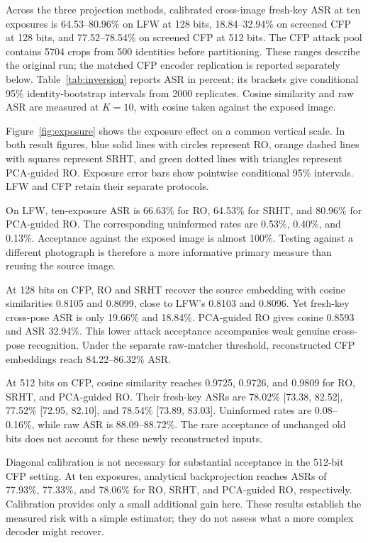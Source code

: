Across the three projection methods, calibrated cross-image fresh-key ASR at ten exposures is 64.53--80.96\% on LFW at 128 bits, 18.84--32.94\% on screened CFP at 128 bits, and 77.52--78.54\% on screened CFP at 512 bits. The CFP attack pool contains 5704 crops from 500 identities before partitioning. These ranges describe the original run; the matched CFP encoder replication is reported separately below. Table~\ref{tab:inversion} reports ASR in percent; its brackets give conditional 95\% identity-bootstrap intervals from 2000 replicates. Cosine similarity and raw ASR are measured at $K=10$, with cosine taken against the exposed image.

Figure~\ref{fig:exposure} shows the exposure effect on a common vertical scale. In both result figures, blue solid lines with circles represent RO, orange dashed lines with squares represent SRHT, and green dotted lines with triangles represent PCA-guided RO. Exposure error bars show pointwise conditional 95\% intervals. LFW and CFP retain their separate protocols.

On LFW, ten-exposure ASR is 66.63\% for RO, 64.53\% for SRHT, and 80.96\% for PCA-guided RO. The corresponding uninformed rates are 0.53\%, 0.40\%, and 0.13\%. Acceptance against the exposed image is almost 100\%. Testing against a different photograph is therefore a more informative primary measure than reusing the source image.

At 128 bits on CFP, RO and SRHT recover the source embedding with cosine similarities 0.8105 and 0.8099, close to LFW's 0.8103 and 0.8096. Yet fresh-key cross-pose ASR is only 19.66\% and 18.84\%. PCA-guided RO gives cosine 0.8593 and ASR 32.94\%. This lower attack acceptance accompanies weak genuine cross-pose recognition. Under the separate raw-matcher threshold, reconstructed CFP embeddings reach 84.22--86.32\% ASR.

At 512 bits on CFP, cosine similarity reaches 0.9725, 0.9726, and 0.9809 for RO, SRHT, and PCA-guided RO. Their fresh-key ASRs are 78.02\% [73.38, 82.52], 77.52\% [72.95, 82.10], and 78.54\% [73.89, 83.03]. Uninformed rates are 0.08--0.16\%, while raw ASR is 88.09--88.72\%. The rare acceptance of unchanged old bits does not account for these newly reconstructed inputs.

Diagonal calibration is not necessary for substantial acceptance in the 512-bit CFP setting. At ten exposures, analytical backprojection reaches ASRs of 77.93\%, 77.33\%, and 78.06\% for RO, SRHT, and PCA-guided RO, respectively. Calibration provides only a small additional gain here. These results establish the measured risk with a simple estimator; they do not assess what a more complex decoder might recover.


